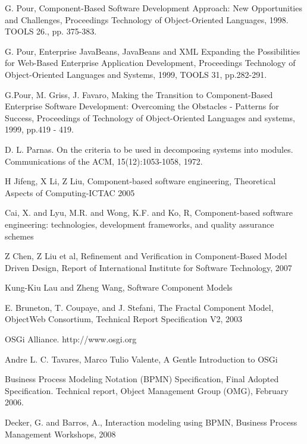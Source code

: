 \begin{thebibliography}{99}

 G. Pour, Component-Based Software Development Approach: New Opportunities and Challenges, Proceedings Technology of Object-Oriented Languages, 1998. TOOLS 26., pp. 375-383.

  G. Pour,  Enterprise JavaBeans,  JavaBeans and XML Expanding the Possibilities for Web-Based Enterprise Application Development,  Proceedings Technology of Object-Oriented Languages and Systems, 1999, TOOLS 31, pp.282-291.

 G.Pour, M. Griss, J. Favaro, Making the Transition to Component-Based Enterprise Software Development: Overcoming the Obstacles - Patterns for Success, Proceedings of Technology of Object-Oriented Languages and systems, 1999, pp.419 - 419.

 D. L. Parnas. On the criteria to be used in decomposing systems into modules. Communications of the ACM, 15(12):1053-1058, 1972.

 H Jifeng, X Li, Z Liu, Component-based software engineering, Theoretical Aspects of Computing-ICTAC 2005

 Cai, X. and Lyu, M.R. and Wong, K.F. and Ko, R, Component-based software engineering: technologies, development frameworks, and quality assurance schemes

 Z Chen, Z Liu et al, Refinement and Verification in Component-Based Model Driven Design, Report of International Institute for Software Technology, 2007

 Kung-Kiu Lau and Zheng Wang, Software Component Models

 E. Bruneton, T. Coupaye, and J. Stefani, The Fractal Component Model, ObjectWeb Consortium, Technical Report Specification V2, 2003

 OSGi Alliance. http://www.osgi.org 

 Andre L. C. Tavares, Marco Tulio Valente, A Gentle Introduction to OSGi

 Business Process Modeling Notation (BPMN) Specification, Final Adopted Specification. Technical report, Object Management Group (OMG), February 2006.

 Decker, G. and Barros, A., Interaction modeling using BPMN, Business Process Management Workshops, 2008


\end{thebibliography}